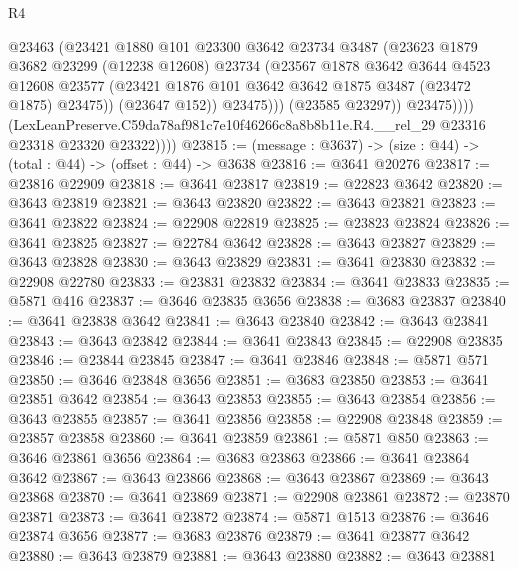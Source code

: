 \begin{lexlean}{R4}
\begin{coremodule}
                        @23463
                        (@23421
                          @1880
                          @101
                          @23300
                          @3642
                          @23734
                          @3487
                          (@23623
                            @1879
                            @3682
                            @23299
                            (@12238 @12608)
                            @23734
                            (@23567
                              @1878
                              @3642
                              @3644
                              @4523
                              @12608
                              @23577
                              (@23421 @1876 @101 @3642 @3642 @1875 @3487 (@23472 @1875) @23475))
                            (@23647 @152))
                          @23475)))
                    (@23585 @23297))
                  @23475))))
          (LexLeanPreserve.C59da78af981c7e10f46266c8a8b8b11e.R4.__rel_29
            @23316
            @23318
            @23320
            @23322))))
@23815 := (message : @3637) -> (size : @44) -> (total : @44) -> (offset : @44) -> @3638
@23816 := @3641 @20276
@23817 := @23816 @22909
@23818 := @3641 @23817
@23819 := @22823 @3642
@23820 := @3643 @23819
@23821 := @3643 @23820
@23822 := @3643 @23821
@23823 := @3641 @23822
@23824 := @22908 @22819
@23825 := @23823 @23824
@23826 := @3641 @23825
@23827 := @22784 @3642
@23828 := @3643 @23827
@23829 := @3643 @23828
@23830 := @3643 @23829
@23831 := @3641 @23830
@23832 := @22908 @22780
@23833 := @23831 @23832
@23834 := @3641 @23833
@23835 := @5871 @416
@23837 := @3646 @23835 @3656
@23838 := @3683 @23837
@23840 := @3641 @23838 @3642
@23841 := @3643 @23840
@23842 := @3643 @23841
@23843 := @3643 @23842
@23844 := @3641 @23843
@23845 := @22908 @23835
@23846 := @23844 @23845
@23847 := @3641 @23846
@23848 := @5871 @571
@23850 := @3646 @23848 @3656
@23851 := @3683 @23850
@23853 := @3641 @23851 @3642
@23854 := @3643 @23853
@23855 := @3643 @23854
@23856 := @3643 @23855
@23857 := @3641 @23856
@23858 := @22908 @23848
@23859 := @23857 @23858
@23860 := @3641 @23859
@23861 := @5871 @850
@23863 := @3646 @23861 @3656
@23864 := @3683 @23863
@23866 := @3641 @23864 @3642
@23867 := @3643 @23866
@23868 := @3643 @23867
@23869 := @3643 @23868
@23870 := @3641 @23869
@23871 := @22908 @23861
@23872 := @23870 @23871
@23873 := @3641 @23872
@23874 := @5871 @1513
@23876 := @3646 @23874 @3656
@23877 := @3683 @23876
@23879 := @3641 @23877 @3642
@23880 := @3643 @23879
@23881 := @3643 @23880
@23882 := @3643 @23881

\end{coremodule}
\end{lexlean}
